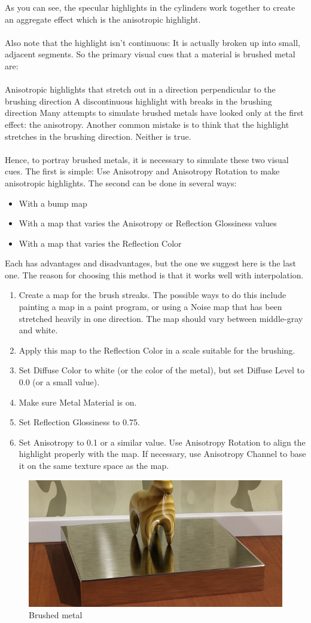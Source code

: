 \documentclass[10pt,a4paper]{article}
\begin{document}
As you can see, the specular highlights in the cylinders work together to create an aggregate effect which is the anisotropic highlight.
\\
\\
Also note that the highlight isn’t continuous: It is actually broken up into small, adjacent segments. So the primary visual cues that a material is brushed metal are:
\\
\\
Anisotropic highlights that stretch out in a direction perpendicular to the brushing direction
A discontinuous highlight with breaks in the brushing direction
Many attempts to simulate brushed metals have looked only at the first effect: the anisotropy. Another common mistake is to think that the highlight stretches in the brushing direction. Neither is true.
\\
\\
Hence, to portray brushed metals, it is necessary to simulate these two visual cues. The first is simple: Use Anisotropy and Anisotropy Rotation to make anisotropic highlights. The second can be done in several ways:

\begin{itemize}
	\item With a bump map
	\item With a map that varies the Anisotropy or Reflection Glossiness values
	\item With a map that varies the Reflection Color
\end{itemize}

Each has advantages and disadvantages, but the one we suggest here is the last one. The reason for choosing this method is that it works well with interpolation.

\begin{enumerate}
	\item Create a map for the brush streaks. The possible ways to do this include painting a map in a paint program, or using a Noise map that has been stretched heavily in one direction. The map should vary between middle-gray and white.
	\item Apply this map to the Reflection Color in a scale suitable for the brushing.
	\item Set Diffuse Color to white (or the color of the metal), but set Diffuse Level to 0.0 (or a small value).
	\item Make sure Metal Material is on.
	\item Set Reflection Glossiness to 0.75.
	\item Set Anisotropy to 0.1 or a similar value. Use Anisotropy Rotation to align the highlight properly with the map. If necessary, use Anisotropy Channel to base it on the same texture space as the map.
\end{enumerate}

\begin{figure}[tbh]
	\centering
	\includegraphics[width=0.5\linewidth]{figure/brushed_metal}
	\caption{Brushed metal}
	\label{fig:brushedmetal}
\end{figure}
\end{document}
